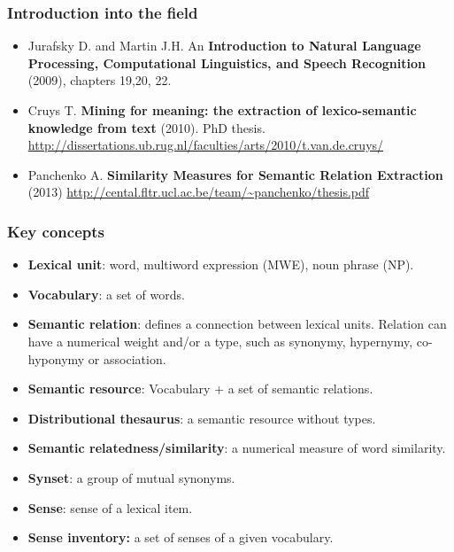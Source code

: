 \begin{frame}
\frametitle{Introduction into the field}

\begin{itemize}
  \item Jurafsky D. and Martin J.H. An \textbf{Introduction to Natural Language Processing, Computational Linguistics, and Speech Recognition} (2009), chapters 19,20, 22.

\item Cruys T. \textbf{Mining for meaning: the extraction of lexico-semantic knowledge from text} (2010). PhD thesis. \url{http://dissertations.ub.rug.nl/faculties/arts/2010/t.van.de.cruys/} 

\item Panchenko A. \textbf{Similarity Measures for Semantic Relation Extraction} (2013) \url{http://cental.fltr.ucl.ac.be/team/~panchenko/thesis.pdf} 


\end{itemize}


\end{frame}



\begin{frame}
\frametitle{Key concepts}

\begin{itemize}
 \item \textbf{Lexical unit}: word, multiword expression (MWE), noun phrase (NP).
 \item \textbf{Vocabulary}: a set of words. 
 \item \textbf{Semantic relation}: defines a connection between lexical units. Relation can have a numerical weight and/or a type, such as synonymy, hypernymy, co-hyponymy or association. 
 \item \textbf{Semantic resource}: Vocabulary + a set of semantic relations. 
 \item \textbf{Distributional thesaurus}: a semantic resource without types. 
 \item \textbf{Semantic relatedness/similarity}: a numerical measure of word similarity.
 \item \textbf{Synset}: a group of mutual synonyms. 
 \item \textbf{Sense}: sense of a lexical item. 
 \item \textbf{Sense inventory:} a set of senses of a given vocabulary. 
\end{itemize}


\end{frame}



